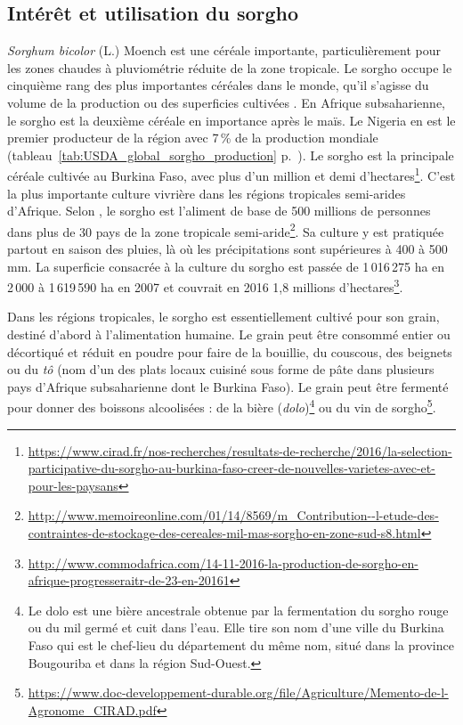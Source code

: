 \documentclass[a4paper,11pt]{article}
\begin{document}
\subsection{Intérêt et utilisation du sorgho}

\emph{Sorghum bicolor} (L.) Moench est une céréale importante,
particulièrement pour les zones chaudes à pluviométrie réduite de la
zone tropicale. Le sorgho occupe le cinquième rang des plus
importantes céréales dans le monde, qu'il s'agisse du volume de la
production ou des superficies cultivées \cite{FAOICRISAT_1997}. En
Afrique subsaharienne, le sorgho est la deuxième céréale en importance
après le maïs. Le Nigeria en est le premier producteur de la région
avec 7\,\% de la production mondiale \cite{FAO_1995}
(tableau~\ref{tab:USDA_global_sorgho_production}
p.~\pageref{tab:USDA_global_sorgho_production}). Le sorgho est la
principale céréale cultivée au Burkina Faso, avec plus d'un million et
demi
d'hectares\footnote{\url{https://www.cirad.fr/nos-recherches/resultats-de-recherche/2016/la-selection-participative-du-sorgho-au-burkina-faso-creer-de-nouvelles-varietes-avec-et-pour-les-paysans}}. C'est
la plus importante culture vivrière dans les régions tropicales
semi-arides d'Afrique. Selon , le sorgho est
l'aliment de base de 500 millions de personnes dans plus de 30 pays de
la zone tropicale
semi-aride\footnote{\url{http://www.memoireonline.com/01/14/8569/m_Contribution--l-etude-des-contraintes-de-stockage-des-cereales-mil-mas-sorgho-en-zone-sud-s8.html}}.
Sa culture y est pratiquée partout en saison des pluies, là où les
précipitations sont supérieures à 400 à 500 mm. La superficie
consacrée à la culture du sorgho est passée de 1\,016\,275 ha en
2\,000 à 1\,619\,590 ha en 2007 \cite{FAO_2007} et couvrait en 2016
1,8 millions
d'hectares\footnote{\url{http://www.commodafrica.com/14-11-2016-la-production-de-sorgho-en-afrique-progresseraitr-de-23-en-20161}}.

Dans les régions tropicales, le sorgho est essentiellement cultivé
pour son grain, destiné d'abord à l'alimentation humaine. Le grain
peut être consommé entier ou décortiqué et réduit en poudre pour faire
de la bouillie, du couscous, des beignets ou du \emph{tô} (nom d'un
des plats locaux cuisiné sous forme de pâte dans plusieurs pays
d'Afrique subsaharienne dont le Burkina Faso). Le grain peut être
fermenté pour donner des boissons alcoolisées : de la bière
(\emph{dolo})\footnote{Le dolo est une bière ancestrale obtenue par la
  fermentation du sorgho rouge ou du mil germé et cuit dans
  l'eau. Elle tire son nom d'une ville du Burkina Faso qui est le
  chef-lieu du département du même nom, situé dans la province
  Bougouriba et dans la région Sud-Ouest.} ou du vin de
sorgho\footnote{\url{https://www.doc-developpement-durable.org/file/Agriculture/Memento-de-l-Agronome_CIRAD.pdf}}.
\end{document}
